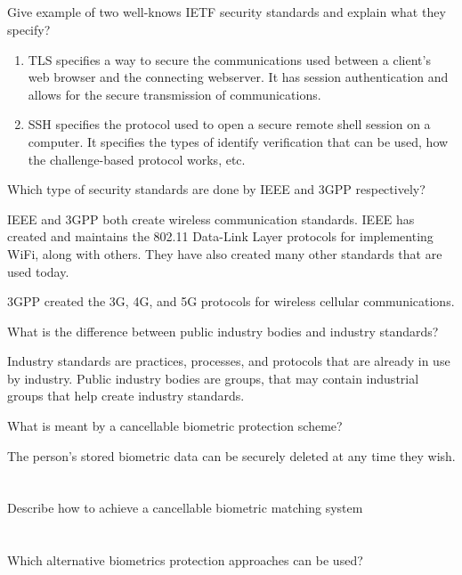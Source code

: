 \begin{questions}
\begin{parts}
  \part{} Give example of two well-knows IETF security standards and explain what they specify?
    \begin{solution}
      \begin{enumerate}[noitemsep]
      \item TLS specifies a way to secure the communications used between a client's web browser and the connecting webserver.
        It has session authentication and allows for the secure transmission of communications.
      \item SSH specifies the protocol used to open a secure remote shell session on a computer.
        It specifies the types of identify verification that can be used, how the challenge-based protocol works, etc.
      \end{enumerate}
    \end{solution}
  \end{parts}

\question{} Which type of security standards are done by IEEE and 3GPP respectively?
  \begin{solution}
    IEEE and 3GPP both create wireless communication standards.
    IEEE has created and maintains the 802.11 Data-Link Layer protocols for implementing WiFi, along with others.
    They have also created many other standards that are used today.

    3GPP created the 3G, 4G, and 5G protocols for wireless cellular communications.
  \end{solution}

\question{} What is the difference between public industry bodies and industry standards?
  \begin{solution}
    Industry standards are practices, processes, and protocols that are already in use by industry.
    Public industry bodies are groups, that may contain industrial groups that help create industry standards.
  \end{solution}

\question{} What is meant by a cancellable biometric protection scheme?
  \begin{solution}
    The person's stored biometric data can be securely deleted at any time they wish.
  \end{solution}

  \begin{parts}
  \part{} Describe how to achieve a cancellable biometric matching system
  \part{} Which alternative biometrics protection approaches can be used?
  \end{parts}
\end{questions}

